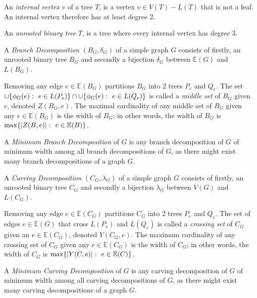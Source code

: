 \documentclass{article}
\begin{document}
	An \textit{internal vertex} $v$ of a tree $T$, is a vertex $v \in V(T) - L(T)$ that is not a leaf. An internal vertex therefore has at least degree 2.

	An \textit{unrooted binary tree} $T$, is a tree where every internal vertex has degree 3.

	A \textit{Branch Decomposition} $(B_G, \delta_G)$ of a simple graph $G$ consists of firstly, an unrooted binary tree $B_G$ and secondly a bijection $\delta_G$ between $\mathbb{E}(G)$ and $L(B_G)$.

	Removing any edge $e \in \mathbb{E}(B_G)$ partitions $B_G$ into 2 trees $P_e$ and $Q_e$. The set $\cup\{\phi_G(e) \,\colon\  e \in L(P_e)\} \cap \cup\{\phi_G(e) \,\colon\  e \in L(Q_e)\}$ is called a \textit{middle set} of $B_G$ given $e$, denoted $Z(B_G,e)$. The maximal cardinality of any middle set of $B_G$ given any $e \in \mathbb{E}(B_G)$ is the width of $B_G$; in other words, the width of $B_G$ is $\max\{ |Z(B, e)| \,\colon\  e \in \mathbb{E}(B) \}$.


	A \textit{Minimum Branch Decomposition} of $G$ is any branch decomposition of $G$ of minimum width among all branch decompositions of $G$, as there might exist many branch decompositions of a graph $G$.

	\begin{center}
		
	\end{center}

	A \textit{Carving Decomposition} $(C_G, \lambda_G)$ of a simple graph $G$ consists of firstly, an unrooted binary tree $C_G$ and secondly a bijection $\lambda_G$ between $V(G)$ and $L(C_G)$.

	Removing any edge $e \in \mathbb{E}(C_G)$ partitions $C_G$ into 2 trees $P_e$ and $Q_e$. The set of edges $e \in \mathbb{E}(G)$ that cross $L(P_e)$ and $L(Q_e)$ is called a \textit{crossing set} of $C_G$ given an $e \in \mathbb{E}(C_G)$, denoted $Y(C_G,e)$. The maximum cardinality of any crossing set of $C_G$ given any $e \in \mathbb{E}(C_G)$ is the width of $C_G$; in other words, the width of $C_G$ is $\max\{ |Y(C, e)| \,\colon\  e \in \mathbb{E}(C) \}$.

	A \textit{Minimum Carving Decomposition} of $G$ is any carving decomposition of $G$ of minimum width among all carving decompositions of $G$, as there might exist many carving decompositions of a graph $G$.

	\begin{center}
		
	\end{center}
\end{document}
